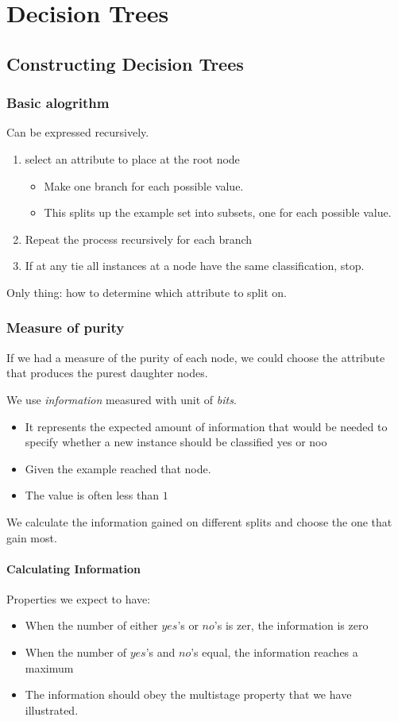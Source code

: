 \chapter{Decision Trees}
\section{Constructing Decision Trees}
\subsection{Basic alogrithm}
Can be expressed recursively. 
\begin{enumerate}
    \item select an attribute to place at the root node
        \begin{itemize}
            \item Make one branch for each possible value.
            \item This splits up the example set into subsets, one for
                each possible value.
        \end{itemize}
    \item Repeat the process recursively for each branch
    \item If at any tie all instances at a node have the same
        classification, stop.
\end{enumerate}

Only thing: how to determine which attribute to split on. 
\subsection{Measure of purity}
If we had a measure of the purity of each node, we could choose the
attribute that produces the purest daughter nodes.

We use \emph{information} measured with unit of \emph{bits}. 
\begin{itemize}
    \item It represents the expected amount of information that would be
        needed to specify whether a new instance should be classified
        yes or noo 
    \item Given the example reached that node.
    \item The value is often less than $1$
\end{itemize}
We calculate the information gained on different splits and choose the one
that gain most.
\subsubsection{Calculating Information}
Properties we expect to have:
\begin{itemize}
    \item When the number of either $yes$'s or $no$'s is zer, the
        information is zero
    \item When the number of $yes$'s and $no$'s equal, the information
        reaches a maximum
    \item The information should obey the multistage property that we
        have illustrated.
\end{itemize}
